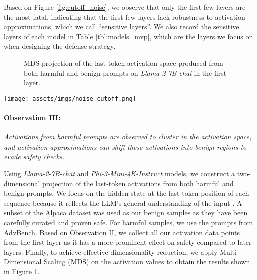 Based on Figure \ref{fig:cutoff_noise}, we observe that only the first few layers are the most fatal, indicating that the first few layers lack robustness to activation approximations, which we call ``sensitive layers''. We also record the sensitive layers of each model in Table \ref{tbl:models_mvp}, which are the layers we focus on when designing the defense strategy.
\begin{figure}[!t]
    \centering
    \caption{MDS projection of the last-token activation space produced from both harmful and benign prompts on \textit{Llama-2-7B-chat} in the first layer.}
    \label{fig:activation_mds}
\end{figure}
\begin{figure*}[!h]
    \centering
    \texttt{[image: assets/imgs/noise\_cutoff.png]}
    \caption{Layer-wise activation approximations on different safety-aligned LLMs. The green lines indicate approximation noise added to activations before $\Wup$. The orange lines indicate approximation noise added to activations before $\Wdown$.}
    \label{fig:cutoff_noise}
\end{figure*}

\paragraph{Observation III:} \textit{Activations from harmful prompts are observed to cluster in the activation space, and activation approximations can shift these activations into benign regions to evade safety checks.} 

Using \textit{Llama-2-7B-chat} and \textit{Phi-3-Mini-4K-Instruct} models, we construct a two-dimensional projection of the last-token activations from both harmful and benign prompts. We focus on the hidden state at the last token position of each sequence because it reflects the LLM's general understanding of the input \cite{brown2020language, raffel2020exploring}. A subset of the Alpaca \cite{alpaca} dataset was used as our benign samples as they have been carefully curated and proven safe. For harmful samples, we use the prompts from AdvBench. Based on Observation II, we collect all our activation data points from the first layer as it has a more prominent effect on safety compared to later layers. Finally, to achieve effective dimensionality reduction, we apply Multi-Dimensional Scaling (MDS) \cite{gao2024shaping} on the activation values to obtain the results shown in Figure \ref{fig:activation_mds}.

